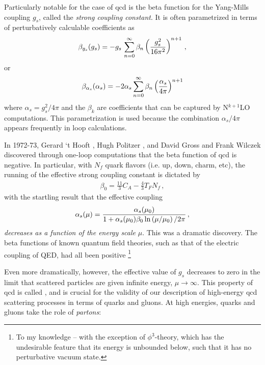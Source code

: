 Particularly notable for the case of \gls{qcd} is the beta function for the Yang-Mills coupling \(g_s\), called the \textit{strong coupling constant}.
%
It is often parametrized in terms of perturbatively calculable coefficients as
\begin{align}
    \beta_{g_s}(g_s)
    =
    -g_s\,
    \sum_{n=0}^\infty \beta_n \left(\frac{g_s^2}{16\pi^2}\right)^{n+1}
    \,,
\end{align}
or
\begin{align}
    \beta_{\alpha_s}(\alpha_s)
    =
    -2\alpha_s
    \sum_{n=0}^\infty \beta_n \left(\frac{\alpha_s}{4\pi}\right)^{n+1}
\end{align}
where \(\alpha_s = g_s^2 / 4 \pi\) and the \(\beta_k\) are coefficients that can be captured by N\(^{k+1}\)LO computations.
%
This parametrization is used because the combination \(\alpha_s / 4\pi\) appears frequently in loop calculations.

In 1972-73, Gerard `t Hooft \cite{tHooft:1998qmr}, Hugh Politzer \cite{Politzer:1973fx}, and David Gross and Frank Wilczek \cite{Gross:1973ju} discovered through one-loop computations that the beta function of \gls{qcd} is negative.
%
In particular, with \(N_f\) quark flavors (i.e. up, down, charm, etc), the  running of the effective strong coupling constant is dictated by
\begin{align}
    \beta_0 = \frac{11}{3} C_A - \frac{4}{3} T_F N_f
    \,,
\end{align}
with the startling result that the effective coupling
\begin{align}
    \alpha_s(\mu)
    =
    \frac{\alpha_s(\mu_0)}{1 + \alpha_s(\mu_0) \beta_0 \ln\left(\mu / \mu_0\right)/2\pi}
    \,,
\end{align}
\textit{decreases as a function of the energy scale} \(\mu\).
%
This was a dramatic discovery.
%
The beta functions of known quantum field theories, such as that of the electric coupling of QED, had all been positive%
\footnote{
    To my knowledge -- with the exception of \(\phi^3\)-theory, which has the undesirable feature that its energy is unbounded below, such that it has no perturbative vacuum state.
}

Even more dramatically, however, the effective value of \(g_s\) decreases to zero in the limit that scattered particles are given infinite energy, \(\mu \to \infty\).
%
This property of \gls{qcd} is called , and is crucial for the validity of our description of high-energy \gls{qcd} scattering processes in terms of quarks and gluons.
%
At high energies, quarks and gluons take the role of \textit{partons}:

